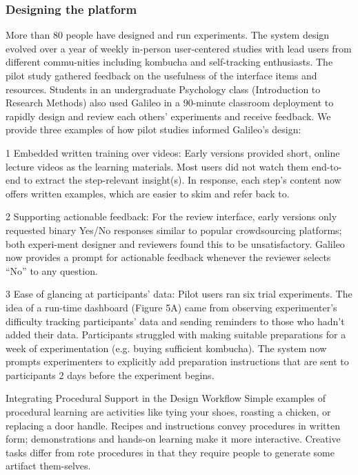 \subsubsection{Designing the platform}
More than 80 people have designed and run experiments. The system design evolved over a year of weekly in-person user-centered studies with lead users from different commu-nities including kombucha and self-tracking enthusiasts. The pilot study gathered feedback on the usefulness of the interface items and resources. Students in an undergraduate Psychology class (Introduction to Research Methods) also used Galileo in a 90-minute classroom deployment to rapidly design and review each others’ experiments and receive feedback. We provide three examples of how pilot studies informed Galileo’s design:

1 Embedded written training over videos: Early versions provided short, online lecture videos as the learning materials. Most users did not watch them end-to-end to extract the step-relevant insight(s). In response, each step’s content now offers written examples, which are easier to skim and refer back to. 

2 Supporting actionable feedback: For the review interface, early versions only requested binary Yes/No responses similar to popular crowdsourcing platforms; both experi-ment designer and reviewers found this to be unsatisfactory. Galileo now provides a prompt for actionable feedback whenever the reviewer selects “No” to any question. 

3 Ease of glancing at participants’ data: Pilot users ran six trial experiments. The idea of a run-time dashboard (Figure 5A) came from observing experimenter’s difficulty tracking participants’ data and sending reminders to those who hadn’t added their data. Participants struggled with making suitable preparations for a week of experimentation (e.g. buying sufficient kombucha). The system now prompts experimenters to explicitly add preparation instructions that are sent to participants 2 days before the experiment begins. 

Integrating Procedural Support in the Design Workflow
Simple examples of procedural learning are activities like tying your shoes, roasting a chicken, or replacing a door handle. Recipes and instructions convey procedures in written form; demonstrations and hands-on learning make it more interactive. Creative tasks differ from rote procedures in that they require people to generate some artifact them-selves.

